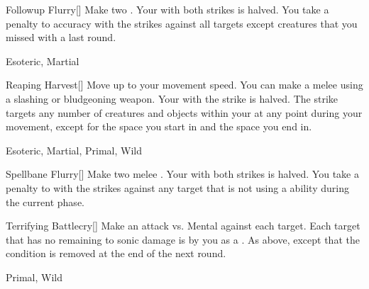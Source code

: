 \lowercase{\hypertarget{maneuver:Followup Flurry}{}}\label{maneuver:Followup Flurry}
\hypertarget{maneuver:Followup Flurry}{}
\begin{freeability}[Rank 6]{Followup Flurry}[]
Make two .
Your  with both strikes is halved.
You take a  penalty to accuracy with the strikes against all targets except creatures that you missed with a  last round.


 Esoteric, Martial
\end{freeability}
\vspace{0.25em}



\lowercase{\hypertarget{maneuver:Reaping Harvest}{}}\label{maneuver:Reaping Harvest}
\hypertarget{maneuver:Reaping Harvest}{}
\begin{freeability}[Rank 6]{Reaping Harvest}[]
Move up to your movement speed.
You can make a melee  using a slashing or bludgeoning weapon.
Your  with the strike is halved.
The strike targets any number of creatures and objects within your  at any point during your movement, except for the space you start in and the space you end in.


 Esoteric, Martial, Primal, Wild
\end{freeability}
\vspace{0.25em}



\lowercase{\hypertarget{maneuver:Spellbane Flurry}{}}\label{maneuver:Spellbane Flurry}
\hypertarget{maneuver:Spellbane Flurry}{}
\begin{freeability}[Rank 6]{Spellbane Flurry}[]
Make two melee .
Your  with both strikes is halved.
You take a  penalty to  with the strikes against any target that is not using a  ability during the current phase.


\end{freeability}
\vspace{0.25em}



\lowercase{\hypertarget{maneuver:Terrifying Battlecry}{}}\label{maneuver:Terrifying Battlecry}
\hypertarget{maneuver:Terrifying Battlecry}{}
\begin{freeability}[Rank 6]{Terrifying Battlecry}[]
Make an attack vs. Mental against each target.
\hit Each target that has no remaining  to sonic damage is  by you as a .
\glance As above, except that the condition is removed at the end of the next round.


 Primal, Wild
\end{freeability}
\vspace{0.25em}


